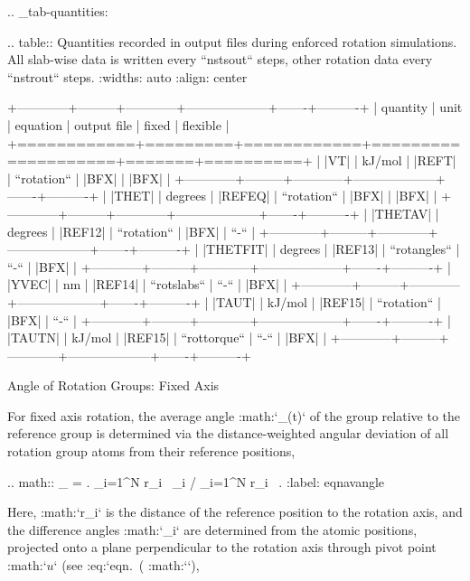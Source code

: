 .. _tab-quantities:

.. table:: Quantities recorded in output files during enforced rotation simulations.
           All slab-wise data is written every ``nstsout`` steps, other rotation data every ``nstrout`` steps.
           :widths: auto
           :align: center

           +------------+---------+------------+--------------------+-------+----------+
           | quantity   | unit    | equation   | output file        | fixed | flexible |
           +============+=========+============+====================+=======+==========+
           | |VT|       | kJ/mol  | |REFT|     | ``rotation``       | |BFX| | |BFX|    |
           +------------+---------+------------+--------------------+-------+----------+
           | |THET|     | degrees | |REFEQ|    | ``rotation``       | |BFX| | |BFX|    |
           +------------+---------+------------+--------------------+-------+----------+
           | |THETAV|   | degrees | |REF12|    | ``rotation``       | |BFX| | ``-``    |
           +------------+---------+------------+--------------------+-------+----------+
           | |THETFIT|  | degrees | |REF13|    | ``rotangles``      | ``-`` | |BFX|    |
           +------------+---------+------------+--------------------+-------+----------+
           | |YVEC|     | nm      | |REF14|    | ``rotslabs``       | ``-`` | |BFX|    |
           +------------+---------+------------+--------------------+-------+----------+
           | |TAUT|     | kJ/mol  | |REF15|    | ``rotation``       | |BFX| | ``-``    |
           +------------+---------+------------+--------------------+-------+----------+
           | |TAUTN|    | kJ/mol  | |REF15|    | ``rottorque``      | ``-`` | |BFX|    |
           +------------+---------+------------+--------------------+-------+----------+




Angle of Rotation Groups: Fixed Axis
^^^^^^^^^^^^^^^^^^^^^^^^^^^^^^^^^^^^

For fixed axis rotation, the average angle :math:`\theta_(t)`
of the group relative to the reference group is determined via the
distance-weighted angular deviation of all rotation group atoms from
their reference positions,

.. math::  \theta_ = \left. \sum_{i=1}^{N} r_i \ \theta_i \right/ \sum_{i=1}^N r_i \ .
           :label: eqnavangle

Here, :math:`r_i` is the distance of the reference position to the
rotation axis, and the difference angles :math:`\theta_i` are determined
from the atomic positions, projected onto a plane perpendicular to the
rotation axis through pivot point :math:`{\mbox{\boldmath ${u}$}}` (see
:eq:`eqn. (%
:math:`\perp`),

